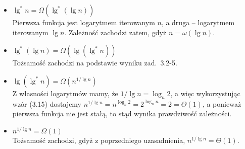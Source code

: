 \begin{itemize}
\item $\lg^*n=\Omega(\lg^*(\lg n))$ \\
	Pierwsza funkcja jest logarytmem iterowanym $n$, a druga -- logarytmem iterowanym $\lg n$. Zależność zachodzi zatem, gdyż $n=\omega(\lg n)$.
\item $\lg^*(\lg n)=\Omega(\lg(\lg^*n))$ \\
	Tożsamość zachodzi na podstawie wyniku zad.~3.2-5.
\item $\lg(\lg^*n)=\Omega\left(n^{1/\lg n}\right)$ \\
	Z własności logarytmów mamy, że $1/\lg n=\log_n2$, a więc wykorzystując wzór (3.15) dostajemy $n^{1/\lg n}=n^{\log_n2}=2^{\log_nn}=2=\Theta(1)$, a ponieważ pierwsza funkcja nie jest stałą, to stąd wynika prawdziwość zależności.
\item $n^{1/\lg n}=\Omega(1)$ \\
	Tożsamość zachodzi, gdyż z poprzedniego uzasadnienia, $n^{1/\lg n}=\Theta(1)$.
\end{itemize}

